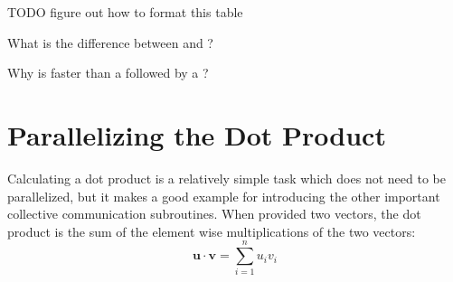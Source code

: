   TODO figure out how to format this table















\begin{problem}
  What is the difference between  and ?
\end{problem}

\begin{problem}
  Why is  faster than a  followed by a ?
\end{problem}



\section*{Parallelizing the Dot Product}
  Calculating a dot product is a relatively simple task which does not need to be parallelized, but it makes a good example for introducing the other important collective communication subroutines. When provided two vectors, the dot product is the sum of the element wise multiplications of the two vectors:
  \[
    \textbf{u} \cdot \textbf{v} = \sum_{i=1}^{n} u_i v_i
  \]

